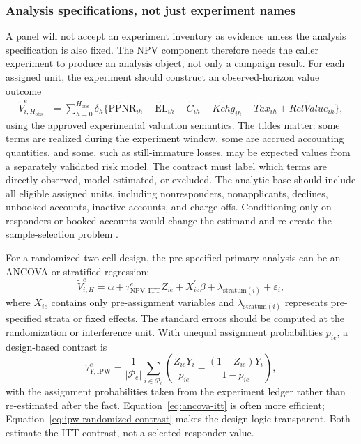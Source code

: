 \documentclass[11pt]{article}
\newcommand{\NPV}{\mathrm{NPV}}
\newcommand{\EL}{\mathrm{EL}}
\newcommand{\PPNR}{\mathrm{PPNR}}
\newcommand{\1}{\mathbf{1}}
\begin{document}
\subsubsection{Analysis specifications, not just experiment names}

A panel will not accept an experiment inventory as evidence unless the analysis
specification is also fixed. The NPV component therefore needs the caller
experiment to produce an analysis object, not only a campaign result. For each
assigned unit, the experiment should construct an observed-horizon value
outcome
\begin{align}
  \widetilde{V}^{e}_{i,H_{\mathrm{obs}}}
  &=
  \sum_{h=0}^{H_{\mathrm{obs}}}\delta_h
  \{\widetilde{\PPNR}_{ih}
    -\widetilde{\EL}_{ih}
    -\widetilde{C}_{ih}
    -\widetilde{Kchg}_{ih}
    -\widetilde{Tax}_{ih}
    +\widetilde{RelValue}_{ih}\},
  \label{eq:experiment-constructed-value}
\end{align}
using the approved experimental valuation semantics. The tildes matter: some
terms are realized during the experiment window, some are accrued accounting
quantities, and some, such as still-immature losses, may be expected values
from a separately validated risk model. The contract must label which terms
are directly observed, model-estimated, or excluded. The analytic base should
include all eligible assigned units, including nonresponders, nonapplicants,
declines, unbooked accounts, inactive accounts, and charge-offs. Conditioning
only on responders or booked accounts would change the estimand and re-create
the sample-selection problem \citep{heckman1979selection}.

For a randomized two-cell design, the pre-specified primary analysis can be an
ANCOVA or stratified regression:
\begin{equation}
  \widetilde{V}^{e}_{i,H}
  =
  \alpha
  +\tau^{e}_{\NPV,\mathrm{ITT}} Z_{ie}
  +X_{ie}^{\prime}\beta
  +\lambda_{\mathrm{stratum}(i)}
  +\varepsilon_i,
  \label{eq:ancova-itt}
\end{equation}
where $X_{ie}$ contains only pre-assignment variables and
$\lambda_{\mathrm{stratum}(i)}$ represents pre-specified strata or fixed
effects. The standard errors should be computed at the randomization or
interference unit. With unequal assignment probabilities $p_{ie}$, a
design-based contrast is
\begin{equation}
  \widehat{\tau}^{e}_{Y,\mathrm{IPW}}
  =
  \frac{1}{|\mathcal{P}_e|}
  \sum_{i\in\mathcal{P}_e}
  \left(
    \frac{Z_{ie}Y_i}{p_{ie}}
    -
    \frac{(1-Z_{ie})Y_i}{1-p_{ie}}
  \right),
  \label{eq:ipw-randomized-contrast}
\end{equation}
with the assignment probabilities taken from the experiment ledger rather than
re-estimated after the fact. Equation~\eqref{eq:ancova-itt} is often more
efficient; Equation~\eqref{eq:ipw-randomized-contrast} makes the design logic
transparent. Both estimate the ITT contrast, not a selected responder value.
\end{document}

